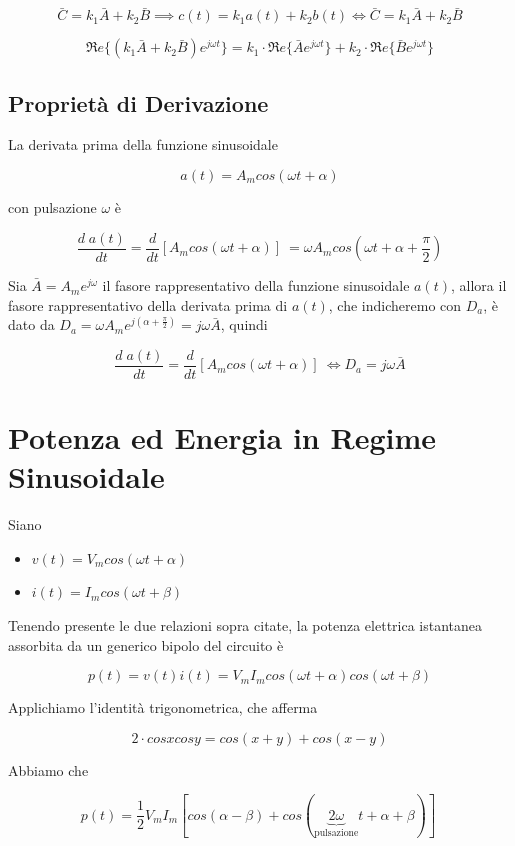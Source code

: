 \documentclass[a4paper]{report}
\begin{document}
\[
\bar{C} = k_1\bar{A}+k_2\bar{B} \implies c(t)=k_1a(t)+k_2b(t)
\Longleftrightarrow \bar{C}=k_1\bar{A}+k_2\bar{B}
\]

\[
\Re e\{(k_1\bar{A}+k_2\bar{B})e^{j\omega t}\} = k_1\cdot \Re e\{\bar{A}e^{j\omega
  t}\}+k_2\cdot \Re e\{\bar{B}e^{j\omega t}\}
\]

\subsection{Propriet\`a di Derivazione}
La derivata prima della funzione sinusoidale

\[
a(t)=A_mcos(\omega t+\alpha)
\]

con pulsazione $\omega$ \`e

\[
\dfrac{d\;a(t)}{dt}=\dfrac{d}{dt}[A_mcos(\omega t+\alpha)]\ = \omega
A_m cos\left(\omega t+\alpha+ \dfrac{\pi}{2}\right)
\]

Sia $\bar{A} = A_me^{j\omega}$ il fasore rappresentativo della
funzione sinusoidale $a(t)$, allora il fasore rappresentativo della
derivata prima di $a(t)$, che indicheremo con $D_a$, \`e dato da $D_a
= \omega A_m e^{j \left(\alpha+ \frac{\pi}{2}\right)} = j\omega
\bar{A}$, quindi

\[
\dfrac {d\;a(t)}{dt}=\dfrac{d}{dt}[A_mcos(\omega
  t+\alpha)]\ \Longleftrightarrow D_a=j\omega \bar{A}
\]

\section{Potenza ed Energia in Regime Sinusoidale}

Siano
\begin{itemize}
\item $v(t)=V_mcos(\omega t+\alpha)$
\item $i(t)=I_mcos(\omega t+\beta)$
\end{itemize}

Tenendo presente le due relazioni sopra citate, la potenza elettrica
istantanea assorbita da un generico bipolo del circuito \`e

\[
p(t)=v(t)i(t)=V_mI_mcos(\omega t+\alpha)cos(\omega t+\beta)
\]

Applichiamo l'identit\`a trigonometrica, che afferma

\[
2\cdot cosxcosy = cos(x+y)+cos(x-y)
\]

Abbiamo che

\[
p(t)=\dfrac{1}{2}V_mI_m[cos(\alpha-\beta)+cos(\underbrace{2\omega}_\text
  {pulsazione} t+\alpha+\beta)]\
\]
\end{document}
